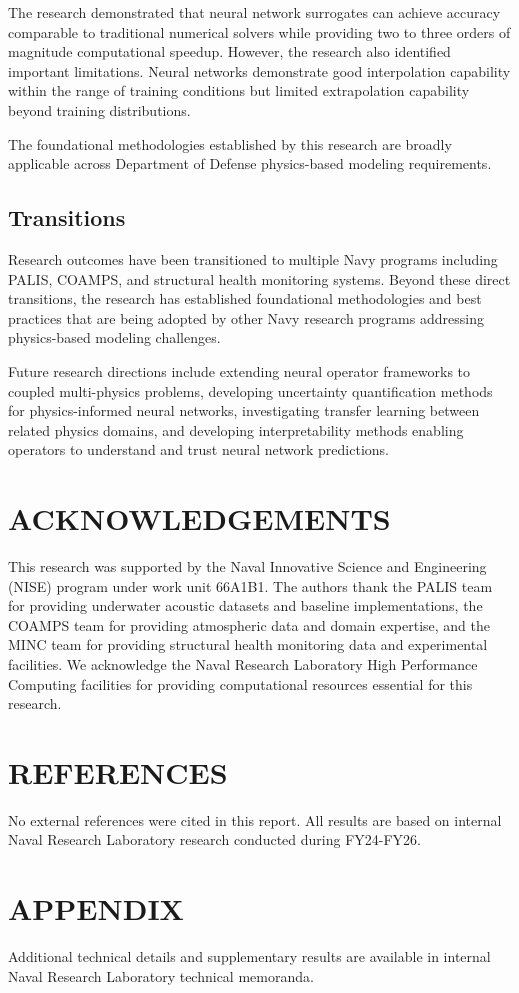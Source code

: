 \documentclass{article}
\begin{document}
The research demonstrated that neural network surrogates can achieve accuracy comparable to traditional numerical solvers while providing two to three orders of magnitude computational speedup. However, the research also identified important limitations. Neural networks demonstrate good interpolation capability within the range of training conditions but limited extrapolation capability beyond training distributions.

The foundational methodologies established by this research are broadly applicable across Department of Defense physics-based modeling requirements.

\subsection{Transitions}

Research outcomes have been transitioned to multiple Navy programs including PALIS, COAMPS, and structural health monitoring systems. Beyond these direct transitions, the research has established foundational methodologies and best practices that are being adopted by other Navy research programs addressing physics-based modeling challenges.

Future research directions include extending neural operator frameworks to coupled multi-physics problems, developing uncertainty quantification methods for physics-informed neural networks, investigating transfer learning between related physics domains, and developing interpretability methods enabling operators to understand and trust neural network predictions.

\section*{ACKNOWLEDGEMENTS}

This research was supported by the Naval Innovative Science and Engineering (NISE) program under work unit 66A1B1. The authors thank the PALIS team for providing underwater acoustic datasets and baseline implementations, the COAMPS team for providing atmospheric data and domain expertise, and the MINC team for providing structural health monitoring data and experimental facilities. We acknowledge the Naval Research Laboratory High Performance Computing facilities for providing computational resources essential for this research.

\section*{REFERENCES}

No external references were cited in this report. All results are based on internal Naval Research Laboratory research conducted during FY24-FY26.

\appendix
\section{APPENDIX}

Additional technical details and supplementary results are available in internal Naval Research Laboratory technical memoranda.
\end{document}
